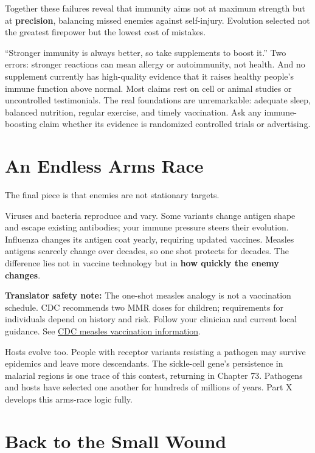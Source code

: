 Together these failures reveal that immunity aims not at maximum strength but at \textbf{precision}, balancing missed enemies against self-injury. Evolution selected not the greatest firepower but the lowest cost of mistakes.

\begin{wuqu}
``Stronger immunity is always better, so take supplements to boost it.'' Two errors: stronger reactions can mean allergy or autoimmunity, not health. And no supplement currently has high-quality evidence that it raises healthy people's immune function above normal. Most claims rest on cell or animal studies or uncontrolled testimonials. The real foundations are unremarkable: adequate sleep, balanced nutrition, regular exercise, and timely vaccination. Ask any immune-boosting claim whether its evidence is randomized controlled trials or advertising.
\end{wuqu}

\section{An Endless Arms Race}

The final piece is that enemies are not stationary targets.

Viruses and bacteria reproduce and vary. Some variants change antigen shape and escape existing antibodies; your immune pressure steers their evolution. Influenza changes its antigen coat yearly, requiring updated vaccines. Measles antigens scarcely change over decades, so one shot protects for decades. The difference lies not in vaccine technology but in \textbf{how quickly the enemy changes}.

\textbf{Translator safety note:} The one-shot measles analogy is not a vaccination schedule. CDC recommends two MMR doses for children; requirements for individuals depend on history and risk. Follow your clinician and current local guidance. See \href{https://www.cdc.gov/measles/vaccines/}{CDC measles vaccination information}.

Hosts evolve too. People with receptor variants resisting a pathogen may survive epidemics and leave more descendants. The sickle-cell gene's persistence in malarial regions is one trace of this contest, returning in Chapter 73. Pathogens and hosts have selected one another for hundreds of millions of years. Part X develops this arms-race logic fully.

\section{Back to the Small Wound}

